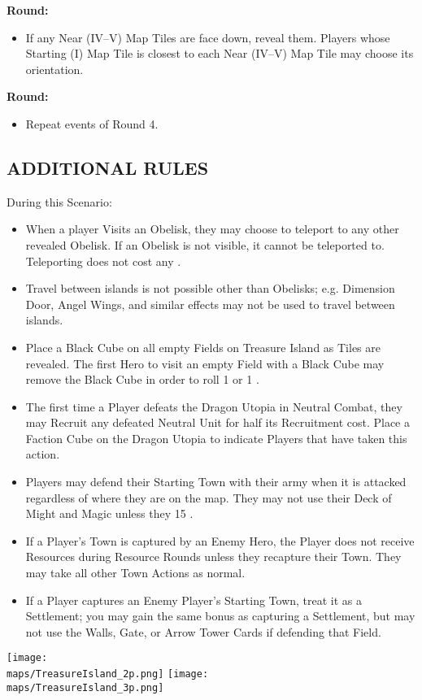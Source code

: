 \begin{multicols*}{2}
\textbf{ Round:}
\begin{itemize}
  \item If any Near (IV--V) Map Tiles are face down, reveal them. Players whose Starting (I) Map Tile is closest to each Near (IV--V) Map Tile may choose its orientation.
\end{itemize}

\textbf{ Round:}
\begin{itemize}
  \item Repeat events of Round 4.
\end{itemize}

\subsection*{\MakeUppercase{Additional Rules}}

During this Scenario:

\begin{itemize}
  \item When a player Visits an Obelisk, they may choose to teleport to any other revealed Obelisk. If an Obelisk is not visible, it cannot be teleported to. Teleporting does not cost any .
  \item Travel between islands is not possible other than Obelisks; e.g. Dimension Door, Angel Wings, and similar effects may not be used to travel between islands.
  \item Place a Black Cube on all empty Fields on Treasure Island as Tiles are revealed. The first Hero to visit an empty Field with a Black Cube may remove the Black Cube in order to roll 1  or 1 .
  \item The first time a Player defeats the Dragon Utopia in Neutral Combat, they may Recruit any defeated Neutral Unit for half its Recruitment cost. Place a Faction Cube on the Dragon Utopia to indicate Players that have taken this action.
  \item Players may defend their Starting Town with their army when it is attacked regardless of where they are on the map. They may not use their Deck of Might and Magic unless they  15 .
  \item If a Player's Town is captured by an Enemy Hero, the Player does not receive Resources during Resource Rounds unless they recapture their Town. They may take all other Town Actions as normal.
  \item If a Player captures an Enemy Player's Starting Town, treat it as a Settlement; you may gain the same bonus as capturing a Settlement, but may not use the Walls, Gate, or Arrow Tower Cards if defending that Field.
\end{itemize}

\begin{center}
  \vfill
  \texttt{[image: \\maps/TreasureIsland\_2p.png]}
  \vfill
  \texttt{[image: \\maps/TreasureIsland\_3p.png]}
  \vfill
\end{center}

\end{multicols*}

